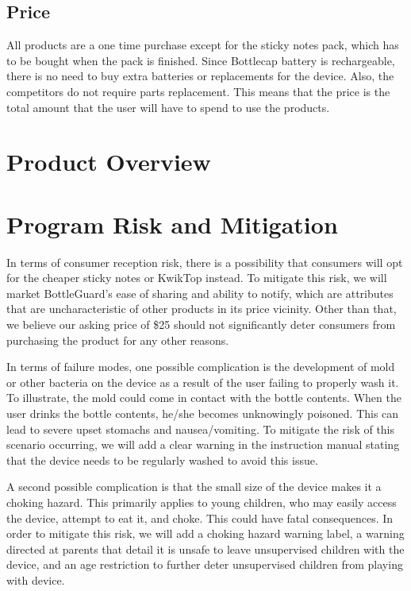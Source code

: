 \documentclass[12pt]{article}
\begin{document}
	\subsection*{Price}
	All products are a one time purchase except for the sticky notes pack, which has to be bought when the pack is finished. Since Bottlecap battery is rechargeable, there is no need to buy extra batteries or replacements for the device. Also, the competitors  do not require parts replacement. This means that the price is the total amount that the user will have to spend to use the products. 
	
	\section*{Product Overview}

	\section*{Program Risk and Mitigation}
	In terms of consumer reception risk, there is a possibility that consumers will opt for the cheaper sticky notes or KwikTop instead. To mitigate this risk, we will market BottleGuard’s ease of sharing and ability to notify, which are attributes that are uncharacteristic of other products in its price vicinity. Other than that, we believe our asking price of \$25 should not significantly deter consumers from purchasing the product for any other reasons.
	
	In terms of failure modes, one possible complication is the development of mold or other bacteria on the device as a result of the user failing to properly wash it. To illustrate, the mold could come in contact with the bottle contents. When the user drinks the bottle contents, he/she becomes unknowingly poisoned. This can lead to severe upset stomachs and nausea/vomiting. To mitigate the risk of this scenario occurring, we will add a clear warning in the instruction manual stating that the device needs to be regularly washed to avoid this issue. 
	
	A second possible complication is that the small size of the device makes it a choking hazard. This primarily applies to young children, who may easily access the device, attempt to eat it, and choke. This could have fatal consequences. In order to mitigate this risk, we will add a choking hazard warning label, a warning directed at parents that detail it is unsafe to leave unsupervised children with the device, and an age restriction to further deter unsupervised children from playing with device.
	
\end{document}
